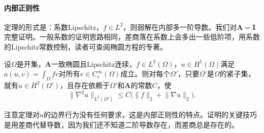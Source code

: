 \paragraph{内部正则性}
定理的形式是：系数Lipschitz，$f\in L^2$，则弱解在内部多一阶导数。我们对$\bm{A}=\bm{I}$完整证明。一般系数的证明思路相同，差商落在系数上会多出一些低阶项，用系数的Lipschitz常数控制，读者可查阅椭圆方程的专著。

\begin{theorem}[内部$H^2$正则性]
\label{thm:ellip-interior}
设$\Omega$是开集，$\bm{A}$一致椭圆且Lipschitz连续，$f\in L^2(\Omega)$，$u\in H^1(\Omega)$满足$a(u,v)=\int_\Omega fv$对所有$v\in C_c^\infty(\Omega)$成立。则对每个$\Omega'$，只要$\overline{\Omega'}$是$\Omega$的紧子集，就有$u\in H^2(\Omega')$，且存在依赖于$\Omega'$和$\bm{A}$的常数$C$，使
\begin{equation}
 \lVert\nabla^2u\rVert_{L^2(\Omega')}\leq C\bigl(\lVert f\rVert_2+\lVert\nabla u\rVert_2\bigr).
 \label{eq:ellip-interior}
\end{equation}
\end{theorem}

注意定理对$u$的边界行为没有任何要求，这是内部正则性的特点。证明的关键技巧是用差商代替导数，因为我们还不知道二阶导数存在，而差商总是存在的。

